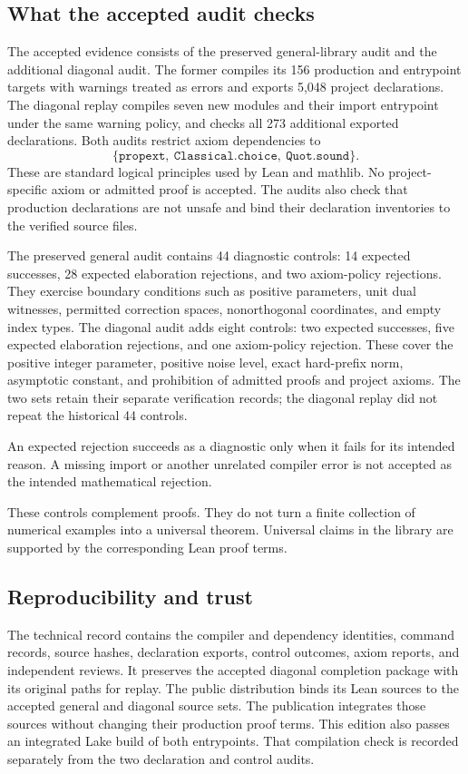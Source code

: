\documentclass[11pt]{article}
\begin{document}
\subsection{What the accepted audit checks}
The accepted evidence consists of the preserved general-library audit and the additional diagonal audit. The former compiles its 156 production and entrypoint targets with warnings treated as errors and exports 5,048 project declarations. The diagonal replay compiles seven new modules and their import entrypoint under the same warning policy, and checks all 273 additional exported declarations. Both audits restrict axiom dependencies to
\[
 \{\texttt{propext},\ \texttt{Classical.choice},\ \texttt{Quot.sound}\}.
\]
These are standard logical principles used by Lean and mathlib. No project-specific axiom or admitted proof is accepted. The audits also check that production declarations are not unsafe and bind their declaration inventories to the verified source files.

The preserved general audit contains 44 diagnostic controls: 14 expected successes, 28 expected elaboration rejections, and two axiom-policy rejections. They exercise boundary conditions such as positive parameters, unit dual witnesses, permitted correction spaces, nonorthogonal coordinates, and empty index types. The diagonal audit adds eight controls: two expected successes, five expected elaboration rejections, and one axiom-policy rejection. These cover the positive integer parameter, positive noise level, exact hard-prefix norm, asymptotic constant, and prohibition of admitted proofs and project axioms. The two sets retain their separate verification records; the diagonal replay did not repeat the historical 44 controls.

An expected rejection succeeds as a diagnostic only when it fails for its intended reason. A missing import or another unrelated compiler error is not accepted as the intended mathematical rejection.

These controls complement proofs. They do not turn a finite collection of numerical examples into a universal theorem. Universal claims in the library are supported by the corresponding Lean proof terms.

\subsection{Reproducibility and trust}
The technical record contains the compiler and dependency identities, command records, source hashes, declaration exports, control outcomes, axiom reports, and independent reviews. It preserves the accepted diagonal completion package with its original paths for replay. The public distribution binds its Lean sources to the accepted general and diagonal source sets. The publication integrates those sources without changing their production proof terms. This edition also passes an integrated Lake build of both entrypoints. That compilation check is recorded separately from the two declaration and control audits.
\end{document}
